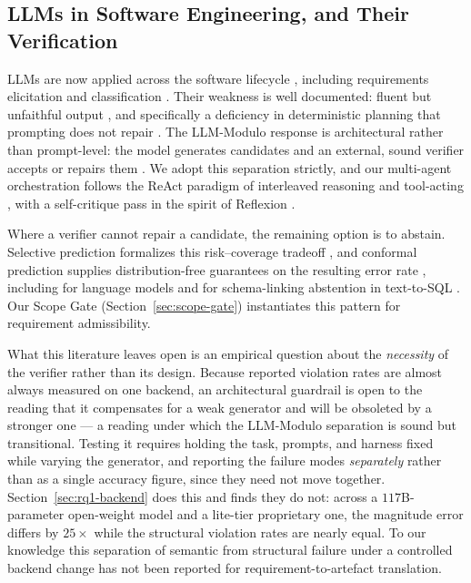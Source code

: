 \documentclass[journal, 10pt]{IEEEtran}
\begin{document}
\subsection{LLMs in Software Engineering, and Their Verification}
LLMs are now applied across the software lifecycle \cite{hou2024llm4se}, including requirements elicitation and classification \cite{arora2024rellm}. Their weakness is well documented: fluent but unfaithful output \cite{ji2023hallucination}, and specifically a deficiency in deterministic planning that prompting does not repair \cite{kambhampati2024,valmeekam2023planbench}. The LLM-Modulo response is architectural rather than prompt-level: the model generates candidates and an external, sound verifier accepts or repairs them \cite{kambhampati2024,garcez2023neurosymbolic}. We adopt this separation strictly, and our multi-agent orchestration follows the ReAct paradigm of interleaved reasoning and tool-acting \cite{yao2023react,wu2023autogen}, with a self-critique pass in the spirit of Reflexion \cite{shinn2023reflexion}.

Where a verifier cannot repair a candidate, the remaining option is to abstain. Selective prediction formalizes this risk--coverage tradeoff \cite{elyaniv2010selective,geifman2017selective}, and conformal prediction supplies distribution-free guarantees on the resulting error rate \cite{vovk2005algorithmic,angelopoulos2023conformal}, including for language models \cite{quach2024conformal} and for schema-linking abstention in text-to-SQL \cite{chen2025rts}. Our Scope Gate (Section~\ref{sec:scope-gate}) instantiates this pattern for requirement admissibility.

What this literature leaves open is an empirical question about the
\emph{necessity} of the verifier rather than its design. Because reported
violation rates are almost always measured on one backend, an architectural
guardrail is open to the reading that it compensates for a weak generator and
will be obsoleted by a stronger one --- a reading under which
the LLM-Modulo separation \cite{kambhampati2024} is sound but transitional. Testing it
requires holding the task, prompts, and harness fixed while varying the
generator, and reporting the failure modes \emph{separately} rather than as a
single accuracy figure, since they need not move together.
Section~\ref{sec:rq1-backend} does this and finds they do not: across a
$117$B-parameter open-weight model and a lite-tier proprietary one, the
magnitude error differs by $25{\times}$ while the structural violation rates are
nearly equal. To our knowledge this separation of semantic from structural
failure under a controlled backend change has not been reported for
requirement-to-artefact translation.
\end{document}
